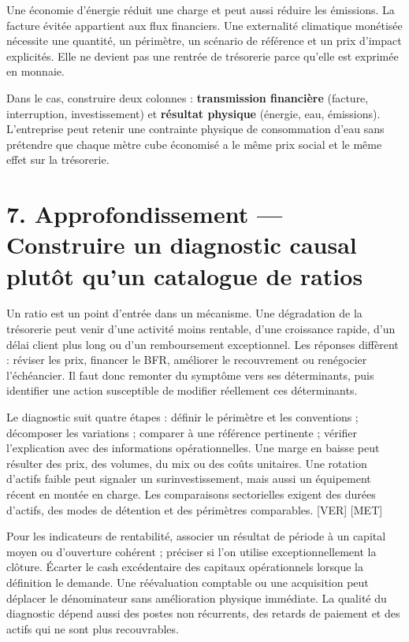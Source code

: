 \documentclass[12pt,a4paper]{article}
\begin{document}
Une économie d’énergie réduit une charge et peut aussi réduire les émissions. La facture évitée appartient aux flux financiers. Une externalité climatique monétisée nécessite une quantité, un périmètre, un scénario de référence et un prix d’impact explicités. Elle ne devient pas une rentrée de trésorerie parce qu’elle est exprimée en monnaie.


Dans le cas, construire deux colonnes : \textbf{transmission financière} (facture, interruption, investissement) et \textbf{résultat physique} (énergie, eau, émissions). L’entreprise peut retenir une contrainte physique de consommation d’eau sans prétendre que chaque mètre cube économisé a le même prix social et le même effet sur la trésorerie.

\section*{7. Approfondissement --- Construire un diagnostic causal plutôt qu’un catalogue de ratios}
Un ratio est un point d’entrée dans un mécanisme. Une dégradation de la trésorerie peut venir d’une activité moins rentable, d’une croissance rapide, d’un délai client plus long ou d’un remboursement exceptionnel. Les réponses diffèrent : réviser les prix, financer le BFR, améliorer le recouvrement ou renégocier l’échéancier. Il faut donc remonter du symptôme vers ses déterminants, puis identifier une action susceptible de modifier réellement ces déterminants.


Le diagnostic suit quatre étapes : définir le périmètre et les conventions ; décomposer les variations ; comparer à une référence pertinente ; vérifier l’explication avec des informations opérationnelles. Une marge en baisse peut résulter des prix, des volumes, du mix ou des coûts unitaires. Une rotation d’actifs faible peut signaler un surinvestissement, mais aussi un équipement récent en montée en charge. Les comparaisons sectorielles exigent des durées d’actifs, des modes de détention et des périmètres comparables. [VER] [MET]


Pour les indicateurs de rentabilité, associer un résultat de période à un capital moyen ou d’ouverture cohérent ; préciser si l’on utilise exceptionnellement la clôture. Écarter le cash excédentaire des capitaux opérationnels lorsque la définition le demande. Une réévaluation comptable ou une acquisition peut déplacer le dénominateur sans amélioration physique immédiate. La qualité du diagnostic dépend aussi des postes non récurrents, des retards de paiement et des actifs qui ne sont plus recouvrables.
\end{document}
